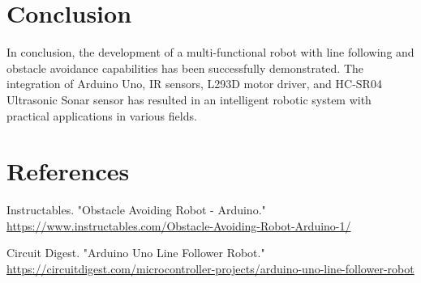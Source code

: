 \documentclass[conference]{IEEEtran}
\begin{document}
\section{Conclusion}
In conclusion, the development of a multi-functional robot with line following and obstacle avoidance capabilities has been successfully demonstrated. The integration of Arduino Uno, IR sensors, L293D motor driver, and HC-SR04 Ultrasonic Sonar sensor has resulted in an intelligent robotic system with practical applications in various fields.

\section*{References}
\begin{thebibliography}{1}
Instructables. "Obstacle Avoiding Robot - Arduino." \url{https://www.instructables.com/Obstacle-Avoiding-Robot-Arduino-1/}

Circuit Digest. "Arduino Uno Line Follower Robot." \url{https://circuitdigest.com/microcontroller-projects/arduino-uno-line-follower-robot}
\end{thebibliography}
\end{document}
